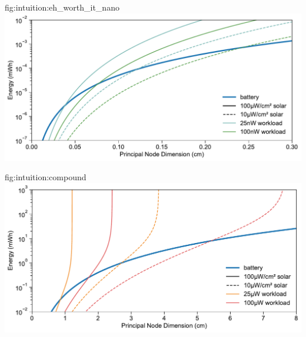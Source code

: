 \begin{definefigure}{fig:intuition:eh_worth_it_nano}
  \centering
  \includegraphics[width=\columnwidth]{figs/is_eh_worth_it_nano.pdf}
  \caption{
  A comparison of preallocated energy and captured energy for \ssi{\nano\watt} applications. 
  This figure is identical to \cref{fig:intuition:eh_worth_it} except that it considers the \ssi{\nano\watt} workloads that characterize millimeter-scale systems.
  A principle node dimension on the order of 1-2\ssi{\milli\meter} is generally sufficient for energy harvesting to collect more energy over a battery, in all but the worst case: a heavier workload with low harvesting potential.
  }
\end{definefigure}


\begin{definefigure}{fig:intuition:compound}
  \centering
  \includegraphics[width=\columnwidth]{figs/is_eh_worth_it_micro_compound.pdf}
  \caption{
    The energy captured by a hybrid system utilizing both harvesting and backup preallocated energy. This figure uses the same scale and line types as \cref{fig:intuition:eh_worth_it}. The addition of energy harvesting to a primary cell system has a compounding effect on lifetime and harvested energy. More harvested energy results in a prolongation of the lifetime of the primary cell. Subsequently, this lifetime extension results in an increase in harvested energy. 
    Because of the increased energy and battery lifetime, the crossing points now shift to the left in the figure, allowing a reduction in volume and area required for a battery and harvester, respectively. 
  }
\end{definefigure}

